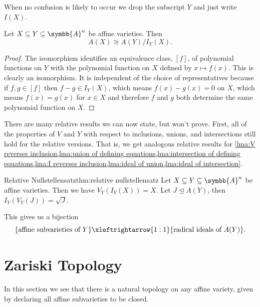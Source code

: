 \documentclass[fleqn]{NotesClass}
\newcommand{\subideal}{\trianglelefteq}
\newcommand{\affine}{\symbb{A}}
\newcommand{\isomorphic}{\cong}
\begin{document}
    \begin{ntn}{}{}
        When no confusion is likely to occur we drop the subscript \(Y\) and just write \(I(X)\).
    \end{ntn}
    
    \begin{lma}{}{}
        Let \(X \subseteq Y \subseteq \affine^n\) be affine varieties.
        Then
        \begin{equation}
            A(X) \isomorphic A(Y) / I_Y(X).
        \end{equation}
        \begin{proof}
            The isomorphism identifies an equivalence class, \([f]\), of polynomial functions on \(Y\) with the polynomial function on \(X\) defined by \(x \mapsto f(x)\).
            This is clearly an isomorphism.
            It is independent of the choice of representatives because if \(f, g \in [f]\) then \(f - g \in I_Y(X)\), which means \(f(x) - g(x) = 0\) on \(X\), which means \(f(x) = g(x)\) for \(x \in X\) and therefore \(f\) and \(g\) both determine the same polynomial function on \(X\).
        \end{proof}
    \end{lma}
    
    There are many relative results we can now state, but won't prove.
    First, all of the properties of \(V\) and \(Y\) with respect to inclusions, unions, and intersections still hold for the relative versions.
    That is, we get analogous relative results for \cref{lma:V reverses inclusion,lma:union of defining equations,lma:intersection of defining equations,lma:I reverses inclusion,lma:ideal of union,lma:ideal of intersection}.
    
    \begin{thm}{Relative Nullstellensatz}{thm:relative nullstellensatz}
        Let \(X \subseteq Y \subseteq \affine^n\) be affine varieties.
        Then we have \(V_Y(I_Y(X)) = X\).
        Let \(J \subideal A(Y)\), then \(I_Y(V_Y(J)) = \sqrt{J}\).
    \end{thm}
    
    This gives us a bijection
    \begin{equation}
        \{\text{affine subvarieties of } Y\} \xleftrightarrow{1:1} \{\text{radical ideals of } A(Y)\}.
    \end{equation}
    
    \chapter{Zariski Topology}
    \label{chap:zariski topology}
    In this section we see that there is a natural topology on any affine variety, given by declaring all affine subvarieties to be closed.
    
\end{document}

